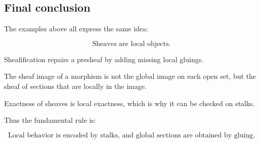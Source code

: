 \documentclass[12pt,a4paper]{article}
\theoremstyle{notespace}
\begin{document}
	\subsection{Final conclusion}
	
	The examples above all express the same idea:
	
	\[
	\boxed{
		\text{Sheaves are local objects.}
	}
	\]
	
	Sheafification repairs a presheaf by adding missing local gluings.
	
	The sheaf image of a morphism is not the global image on each open set, but
	the sheaf of sections that are locally in the image.
	
	Exactness of sheaves is local exactness, which is why it can be checked on
	stalks.
	
	Thus the fundamental rule is:
	
	\[
	\boxed{
		\text{Local behavior is encoded by stalks, and global sections are obtained by gluing.}
	}
	\]
	
\end{document}
